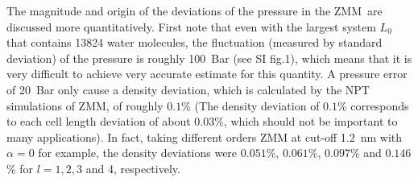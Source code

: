 \documentclass[a4paper,preprint,unsortedaddress,onecolumn,fleqn]{revtex4}
\begin{document}
{The magnitude and origin of the deviations of the pressure in
the ZMM\ are discussed more quantitatively. First note that even with the
largest} system $L_{0}$ that contains 13824 water molecules, the fluctuation
(measured by standard deviation) of the pressure is roughly 100~Bar {%
(see SI fig.1)}, which means that it is very difficult to
achieve very accurate estimate for this quantity. {A pressure
error of 20~Bar only cause a density deviation, which is calculated by the
NPT simulations of ZMM, of roughly }${0.1}${\% (The density
deviation of ${0.1}$\% corresponds to each cell length deviation of about $%
0.03$\%, which should not be important to many applications). In fact,}
taking different orders ZMM at cut-off 1.2~nm with $\alpha =0$%
 for example, the density deviations {were} $0.051$\%, 
$0.061$\%, $0.097$\% and $0.146$\% for $l=1,2,3$ and 4, respectively.
\end{document}
